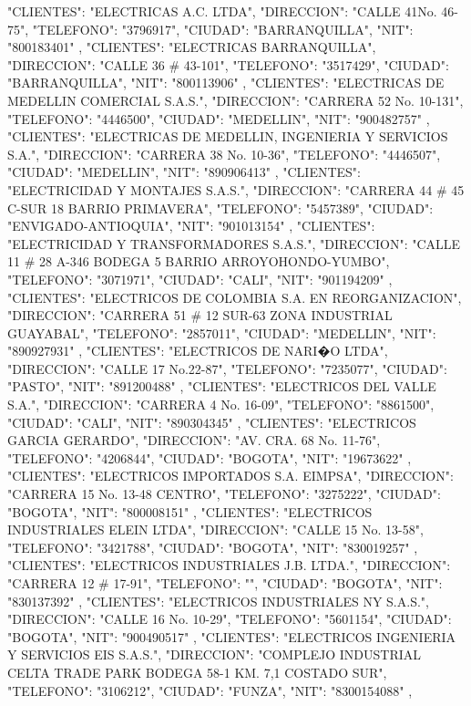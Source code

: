    {
   "CLIENTES": "ELECTRICAS A.C. LTDA",
   "DIRECCION": "CALLE 41No. 46-75",
   "TELEFONO": "3796917",
   "CIUDAD": "BARRANQUILLA",
   "NIT": "800183401"
   },
   {
   "CLIENTES": "ELECTRICAS BARRANQUILLA",
   "DIRECCION": "CALLE 36 # 43-101",
   "TELEFONO": "3517429",
   "CIUDAD": "BARRANQUILLA",
   "NIT": "800113906"
   },
   {
   "CLIENTES": "ELECTRICAS DE MEDELLIN COMERCIAL S.A.S.",
   "DIRECCION": "CARRERA 52 No. 10-131",
   "TELEFONO": "4446500",
   "CIUDAD": "MEDELLIN",
   "NIT": "900482757"
   },
   {
   "CLIENTES": "ELECTRICAS DE MEDELLIN, INGENIERIA Y SERVICIOS S.A.",
   "DIRECCION": "CARRERA 38 No. 10-36",
   "TELEFONO": "4446507",
   "CIUDAD": "MEDELLIN",
   "NIT": "890906413"
   },
   {
   "CLIENTES": "ELECTRICIDAD Y MONTAJES S.A.S.",
   "DIRECCION": "CARRERA 44 # 45 C-SUR 18 BARRIO PRIMAVERA",
   "TELEFONO": "5457389",
   "CIUDAD": "ENVIGADO-ANTIOQUIA",
   "NIT": "901013154"
   },
   {
   "CLIENTES": "ELECTRICIDAD Y TRANSFORMADORES S.A.S.",
   "DIRECCION": "CALLE 11 # 28 A-346 BODEGA 5 BARRIO ARROYOHONDO-YUMBO",
   "TELEFONO": "3071971",
   "CIUDAD": "CALI",
   "NIT": "901194209"
   },
   {
   "CLIENTES": "ELECTRICOS DE COLOMBIA S.A. EN REORGANIZACION",
   "DIRECCION": "CARRERA 51 # 12 SUR-63 ZONA INDUSTRIAL GUAYABAL",
   "TELEFONO": "2857011",
   "CIUDAD": "MEDELLIN",
   "NIT": "890927931"
   },
   {
   "CLIENTES": "ELECTRICOS DE NARI�O LTDA",
   "DIRECCION": "CALLE 17 No.22-87",
   "TELEFONO": "7235077",
   "CIUDAD": "PASTO",
   "NIT": "891200488"
   },
   {
   "CLIENTES": "ELECTRICOS DEL VALLE S.A.",
   "DIRECCION": "CARRERA 4 No. 16-09",
   "TELEFONO": "8861500",
   "CIUDAD": "CALI",
   "NIT": "890304345"
   },
   {
   "CLIENTES": "ELECTRICOS GARCIA GERARDO",
   "DIRECCION": "AV. CRA. 68 No. 11-76",
   "TELEFONO": "4206844",
   "CIUDAD": "BOGOTA",
   "NIT": "19673622"
   },
   {
   "CLIENTES": "ELECTRICOS IMPORTADOS S.A. EIMPSA",
   "DIRECCION": "CARRERA 15 No. 13-48 CENTRO",
   "TELEFONO": "3275222",
   "CIUDAD": "BOGOTA",
   "NIT": "800008151"
   },
   {
   "CLIENTES": "ELECTRICOS INDUSTRIALES ELEIN LTDA",
   "DIRECCION": "CALLE 15 No. 13-58",
   "TELEFONO": "3421788",
   "CIUDAD": "BOGOTA",
   "NIT": "830019257"
   },
   {
   "CLIENTES": "ELECTRICOS INDUSTRIALES J.B. LTDA.",
   "DIRECCION": "CARRERA 12 # 17-91",
   "TELEFONO": "",
   "CIUDAD": "BOGOTA",
   "NIT": "830137392"
   },
   {
   "CLIENTES": "ELECTRICOS INDUSTRIALES NY S.A.S.",
   "DIRECCION": "CALLE 16 No. 10-29",
   "TELEFONO": "5601154",
   "CIUDAD": "BOGOTA",
   "NIT": "900490517"
   },
   {
   "CLIENTES": "ELECTRICOS INGENIERIA Y SERVICIOS EIS S.A.S.",
   "DIRECCION": "COMPLEJO INDUSTRIAL CELTA TRADE PARK BODEGA 58-1 KM. 7,1 COSTADO SUR",
   "TELEFONO": "3106212",
   "CIUDAD": "FUNZA",
   "NIT": "8300154088"
   },
